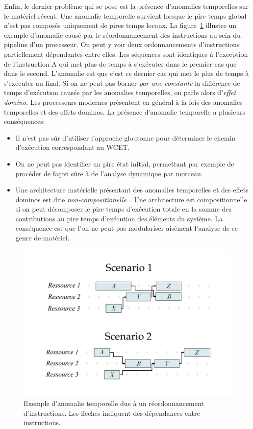 Enfin, le dernier problème qui se pose est la présence d'anomalies temporelles sur le matériel récent.
Une anomalie temporelle survient lorsque le pire temps global n'est pas composés uniquement de pires temps locaux.
La figure~\ref{fig:anomalie} illustre un exemple d'anomalie causé par le réordonnancement des instructions au sein du pipeline d'un processeur.
On peut y voir deux ordonnancements d'instructions partiellement dépendantes entre elles.
Les séquences sont identiques à l'exception de l'instruction A qui met plus de temps à s'exécuter dans le premier cas que dans le second.
L'anomalie est que c'est ce dernier cas qui met le plus de temps à s'exécuter au final.
Si on ne peut pas borner \emph{par une constante} la différence de temps d'exécution causée par les anomalies temporelles, on parle alors d'\emph{effet domino}.
Les processeurs modernes présentent en général à la fois des anomalies temporelles et des effets dominos.
La présence d'anomalie temporelle a plusieurs conséquences:
\begin{itemize}
	\item Il n'est pas sûr d'utiliser l'approche gloutonne pour déterminer le chemin d'exécution correspondant au WCET.
	\item On ne peut pas identifier un pire état initial, permettant par exemple de procéder de façon sûre à de l'analyse dynamique par morceau.
	\item Une architecture matérielle présentant des anomalies temporelles et des effets dominos est dite \emph{non-compositionelle}~\cite{hahn2015towards}.
	Une architecture est compositionnelle si on peut décomposer le pire temps d'exécution totale en la somme des contributions au pire temps d'exécution des éléments du système.
	La conséquence est que l'on ne peut pas modulariser aisément l'analyse de ce genre de matériel.
\end{itemize}

\begin{figure}
\centering
\includegraphics[width=0.7\linewidth]{graphics/figures/anomalie2.pdf}
\caption{\label{fig:anomalie} Exemple d'anomalie temporelle due à un réordonnancement d'instructions. Les flèches indiquent des dépendances entre instructions.}
\end{figure}

